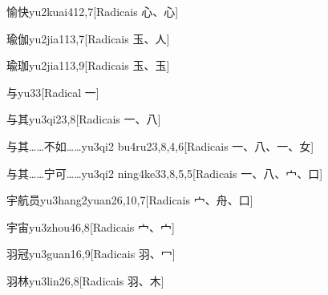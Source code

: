 \begin{entry}{愉快}{yu2kuai4}{12,7}[Radicais ⼼、⼼]
\end{entry}

\begin{entry}{瑜伽}{yu2jia1}{13,7}[Radicais ⽟、⼈]
\end{entry}

\begin{entry}{瑜珈}{yu2jia1}{13,9}[Radicais ⽟、⽟]
\end{entry}

\begin{entry}{与}{yu3}{3}[Radical ⼀]
\end{entry}

\begin{entry}{与其}{yu3qi2}{3,8}[Radicais ⼀、⼋]
\end{entry}

\begin{entry}{与其……不如……}{yu3qi2 bu4ru2}{3,8,4,6}[Radicais ⼀、⼋、⼀、⼥]
\end{entry}

\begin{entry}{与其……宁可……}{yu3qi2 ning4ke3}{3,8,5,5}[Radicais ⼀、⼋、⼧、⼝]
\end{entry}

\begin{entry}{宇航员}{yu3hang2yuan2}{6,10,7}[Radicais ⼧、⾈、⼝]
\end{entry}

\begin{entry}{宇宙}{yu3zhou4}{6,8}[Radicais ⼧、⼧]
\end{entry}

\begin{entry}{羽冠}{yu3guan1}{6,9}[Radicais ⽻、⼍]
\end{entry}

\begin{entry}{羽林}{yu3lin2}{6,8}[Radicais ⽻、⽊]
\end{entry}

